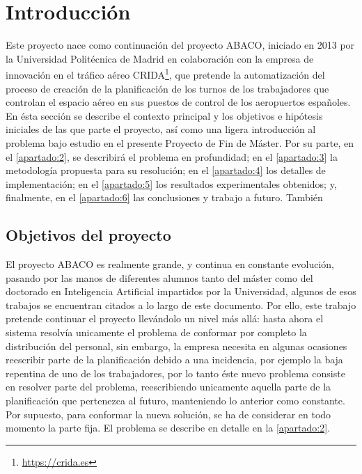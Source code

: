 \graphicspath{{capitulos/Capitulo1-Introduccion/recursos/}}


\section{Introducción}

Este proyecto nace como continuación del proyecto ABACO, iniciado en 2013 por la Universidad Politécnica de Madrid en
colaboración con la empresa de innovación en el tráfico aéreo CRIDA\footnote{\url{https://crida.es}}, que pretende la
automatización del proceso de creación de la planificación de los turnos de los trabajadores que controlan el espacio 
aéreo en sus puestos de control de los aeropuertos españoles.
\\

En ésta sección se describe el contexto principal y los objetivos e hipótesis iniciales de las que parte el proyecto, 
así como una ligera introducción al problema bajo estudio en el presente Proyecto de Fin de Máster. Por su parte, en el 
\autoref{apartado:2}, se describirá el problema en profundidad; en el \autoref{apartado:3}
la metodología propuesta para su resolución; en el \autoref{apartado:4} los detalles de implementación;
en el \autoref{apartado:5} los resultados experimentales obtenidos; y, finalmente, en el \autoref{apartado:6} las 
conclusiones y trabajo a futuro. También  %

\subsection{Objetivos del proyecto}
\label{sec:Objectivos}
El proyecto \gls{ABACO} es realmente grande, y continua en constante evolución, pasando por las manos de 
diferentes alumnos
tanto del máster como del doctorado en Inteligencia Artificial impartidos por la Universidad, algunos de esos trabajos 
se encuentran citados a lo largo de este documento. 
Por ello, este trabajo pretende continuar el proyecto llevándolo un nivel más allá: hasta ahora el sistema resolvía 
unicamente el problema de conformar por completo la distribución del personal, sin embargo, la empresa necesita en 
algunas ocasiones reescribir parte de la planificación debido a una incidencia, por ejemplo la baja repentina de uno de 
los trabajadores, por lo tanto éste nuevo problema consiste en resolver parte del problema, reescribiendo unicamente 
aquella parte de la planificación que pertenezca al futuro, manteniendo lo anterior como constante. Por supuesto, para 
conformar la nueva solución, se ha de considerar en todo momento la parte fija. El problema se describe en detalle en 
la \autoref{apartado:2}.
\\

